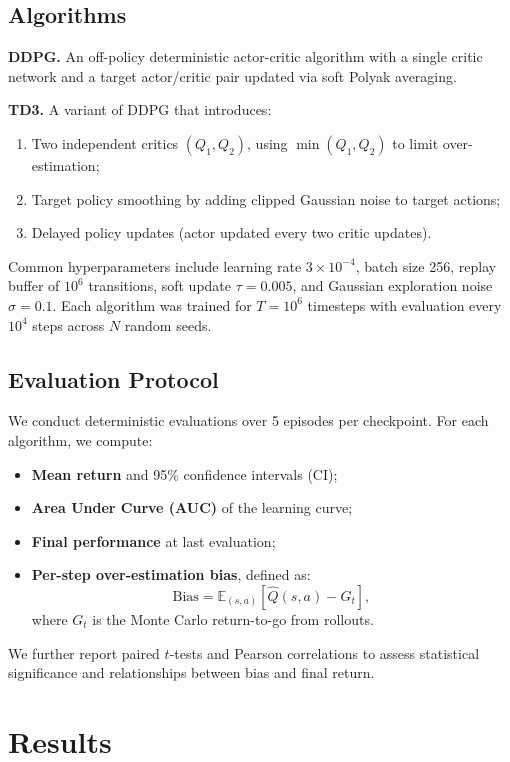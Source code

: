 \documentclass[10pt,letterpaper]{article}
\begin{document}
\subsection{Algorithms}
\textbf{DDPG.} An off-policy deterministic actor-critic algorithm with a single critic network and a target actor/critic pair updated via soft Polyak averaging.

\textbf{TD3.} A variant of DDPG that introduces:
\begin{enumerate}
  \item Two independent critics $(Q_1, Q_2)$, using $\min(Q_1,Q_2)$ to limit over-estimation;
  \item Target policy smoothing by adding clipped Gaussian noise to target actions;
  \item Delayed policy updates (actor updated every two critic updates).
\end{enumerate}

Common hyperparameters include learning rate $3\times10^{-4}$, batch size 256, replay buffer of $10^6$ transitions, soft update $\tau=0.005$, and Gaussian exploration noise $\sigma=0.1$. Each algorithm was trained for $T=10^6$ timesteps with evaluation every $10^4$ steps across $N$ random seeds.

\subsection{Evaluation Protocol}
We conduct deterministic evaluations over 5 episodes per checkpoint. For each algorithm, we compute:
\begin{itemize}
  \item \textbf{Mean return} and 95\% confidence intervals (CI);
  \item \textbf{Area Under Curve (AUC)} of the learning curve;
  \item \textbf{Final performance} at last evaluation;
  \item \textbf{Per-step over-estimation bias}, defined as:
  \[
  \text{Bias} = \mathbb{E}_{(s,a)}[\hat{Q}(s,a) - G_t],
  \]
  where $G_t$ is the Monte Carlo return-to-go from rollouts.
\end{itemize}

We further report paired $t$-tests and Pearson correlations to assess statistical significance and relationships between bias and final return.

\section{Results}
\end{document}
